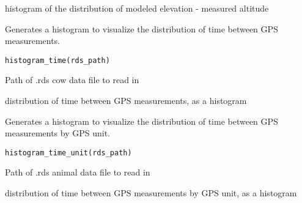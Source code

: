 \documentclass[a4paper]{book}
\begin{document}
%
\begin{Value}
histogram of the distribution of modeled elevation - measured altitude
\end{Value}
%
\begin{Description}\relax
Generates a histogram to visualize the distribution of time
between GPS measurements.
\end{Description}
%
\begin{Usage}
\begin{verbatim}
histogram_time(rds_path)
\end{verbatim}
\end{Usage}
%
\begin{Arguments}
\begin{ldescription}
\item[\code{rds\_path}] Path of .rds cow data file to read in
\end{ldescription}
\end{Arguments}
%
\begin{Value}
distribution of time between GPS measurements, as a histogram
\end{Value}
%
\begin{Description}\relax
Generates a histogram to visualize the distribution of time between
GPS measurements by GPS unit.
\end{Description}
%
\begin{Usage}
\begin{verbatim}
histogram_time_unit(rds_path)
\end{verbatim}
\end{Usage}
%
\begin{Arguments}
\begin{ldescription}
\item[\code{rds\_path}] Path of .rds animal data file to read in
\end{ldescription}
\end{Arguments}
%
\begin{Value}
distribution of time between GPS measurements by GPS unit, as a histogram
\end{Value}
\end{document}
